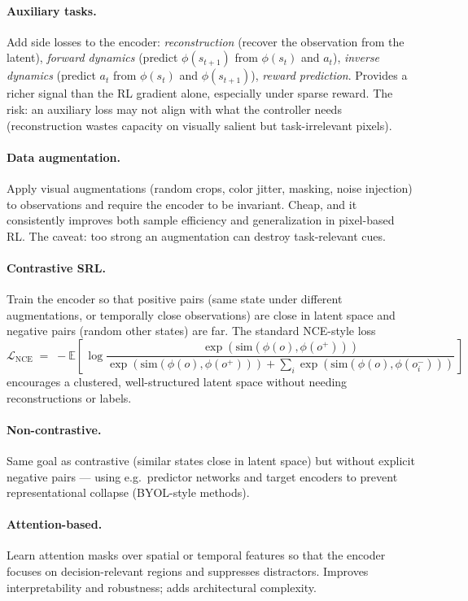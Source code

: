 \documentclass[11pt, oneside]{book}
\newcommand{\E}{\mathbb{E}}              %
\begin{document}
\paragraph{Auxiliary tasks.}
Add side losses to the encoder: \emph{reconstruction} (recover the observation from the
latent), \emph{forward dynamics} (predict $\phi(s_{t+1})$ from $\phi(s_t)$ and $a_t$),
\emph{inverse dynamics} (predict $a_t$ from $\phi(s_t)$ and $\phi(s_{t+1})$),
\emph{reward prediction}. Provides a richer signal than the RL gradient alone, especially
under sparse reward. The risk: an auxiliary loss may not align with what the controller
needs (reconstruction wastes capacity on visually salient but task-irrelevant pixels).

\paragraph{Data augmentation.}
Apply visual augmentations (random crops, color jitter, masking, noise injection) to
observations and require the encoder to be invariant. Cheap, and it consistently
improves both sample efficiency and generalization in pixel-based RL. The caveat: too
strong an augmentation can destroy task-relevant cues.

\paragraph{Contrastive SRL.}
Train the encoder so that positive pairs (same state under different augmentations,
or temporally close observations) are close in latent space and negative pairs (random
other states) are far. The standard NCE-style loss
\[
  \mathcal{L}_{\text{NCE}}
  \;=\; -\E\!\left[\, \log \frac{\exp(\mathrm{sim}(\phi(o), \phi(o^+)))}
                          {\exp(\mathrm{sim}(\phi(o), \phi(o^+))) + \sum_i \exp(\mathrm{sim}(\phi(o), \phi(o_i^-)))}\, \right]
\]
encourages a clustered, well-structured latent space without needing reconstructions
or labels.

\paragraph{Non-contrastive.}
Same goal as contrastive (similar states close in latent space) but without explicit
negative pairs --- using e.g.\ predictor networks and target encoders to prevent
representational collapse (BYOL-style methods).

\paragraph{Attention-based.}
Learn attention masks over spatial or temporal features so that the encoder focuses on
decision-relevant regions and suppresses distractors. Improves interpretability and
robustness; adds architectural complexity.
\end{document}
